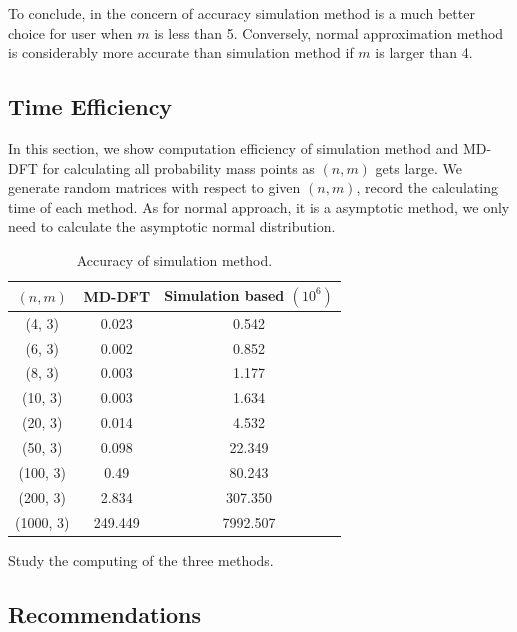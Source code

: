 \documentclass[12pt]{article}
\begin{document}
To conclude, in the concern of accuracy simulation method is a much better choice for user when $m$ is less than 5. Conversely, normal approximation method is considerably more accurate than simulation method if $m$ is larger than 4.
\subsection{Time Efficiency}
In this section, we show computation efficiency of simulation method and MD-DFT for calculating all probability mass points as $(n,m)$ gets large. We generate random matrices with respect to given $(n, m)$, record the calculating time of each method. As for normal approach, it is a asymptotic method, we only need to calculate the asymptotic normal distribution.

\begin{table}%
\centering
\caption{Accuracy of simulation method.}\label{tab:my_label}
\begin{tabular}{c|c|c}
\hline
\hline
     $(n, m)$ & MD-DFT & Simulation based $(10^6)$  \\
\hline
    (4, 3) & 0.023 & 0.542 \\
\hline
    (6, 3) & 0.002 & 0.852\\
\hline
    (8, 3) & 0.003 & 1.177\\
    (10, 3) & 0.003 & 1.634\\
    (20, 3) & 0.014 & 4.532\\
    (50, 3) & 0.098 & 22.349\\
    (100, 3) & 0.49 & 80.243\\
    (200, 3) & 2.834 & 307.350\\
    (1000, 3) & 249.449  & 7992.507 \\
\hline\hline
\end{tabular}
\end{table}
Study the computing of the three methods.


\subsection{Recommendations}
\end{document}
